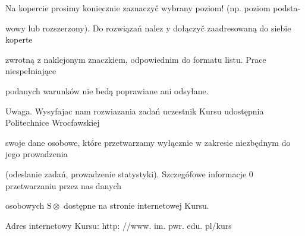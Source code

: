 \documentclass[a4paper,12pt]{article}
\begin{document}
Na kopercie prosimy $\underline{\mathrm{k}\mathrm{o}\mathrm{n}\mathrm{i}\mathrm{e}\mathrm{c}\mathrm{z}\mathrm{n}\mathrm{i}\mathrm{e}}$ zaznaczyč wybrany poziom! (np. poziom podsta-

wowy lub rozszerzony). Do rozwiązań nalez $\mathrm{y}$ dołączyč zaadresowaną do siebie koperte

zwrotną $\mathrm{z}$ naklejonym znaczkiem, odpowiednim do formatu listu. Prace niespełniające

podanych warunków nie bedą poprawiane ani odsyłane.

Uwaga. Wysyfajac nam rozwiazania zadań uczestnik Kursu udostępnia Politechnice Wrocfawskiej

swoje dane osobowe, które przetwarzamy wyłącznie $\mathrm{w}$ zakresie niezbędnym do jego prowadzenia

(odeslanie zadań, prowadzenie statystyki). Szczegófowe informacje $0$ przetwarzaniu przez nas danych

osobowych $\mathrm{S}\otimes$ dostępne na stronie internetowej Kursu.

Adres internetowy Kursu: http: //www. im. pwr. edu. pl/kurs
\end{document}
